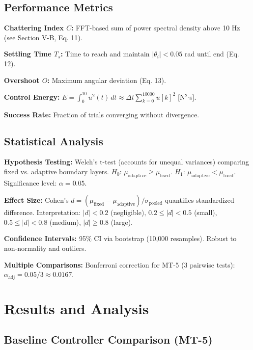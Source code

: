 \documentclass[conference]{IEEEtran}
\begin{document}
\subsection{Performance Metrics}

\textbf{Chattering Index $C$:} FFT-based sum of power spectral density above 10 Hz (see Section V-B, Eq. 11).

\textbf{Settling Time $T_s$:} Time to reach and maintain $|\theta_i| < 0.05$ rad until end (Eq. 12).

\textbf{Overshoot $O$:} Maximum angular deviation (Eq. 13).

\textbf{Control Energy:} $E = \int_0^{10} u^2(t) \, dt \approx \Delta t \sum_{k=0}^{10000} u[k]^2$ [N$^2$$\cdot$s].

\textbf{Success Rate:} Fraction of trials converging without divergence.

\subsection{Statistical Analysis}

\textbf{Hypothesis Testing:} Welch's t-test (accounts for unequal variances) comparing fixed vs. adaptive boundary layers. $H_0$: $\mu_{\text{adaptive}} \geq \mu_{\text{fixed}}$. $H_1$: $\mu_{\text{adaptive}} < \mu_{\text{fixed}}$. Significance level: $\alpha = 0.05$.

\textbf{Effect Size:} Cohen's $d = (\mu_{\text{fixed}} - \mu_{\text{adaptive}}) / \sigma_{\text{pooled}}$ quantifies standardized difference. Interpretation: $|d| < 0.2$ (negligible), $0.2 \leq |d| < 0.5$ (small), $0.5 \leq |d| < 0.8$ (medium), $|d| \geq 0.8$ (large).

\textbf{Confidence Intervals:} 95\% CI via bootstrap (10,000 resamples). Robust to non-normality and outliers.

\textbf{Multiple Comparisons:} Bonferroni correction for MT-5 (3 pairwise tests): $\alpha_{\text{adj}} = 0.05/3 \approx 0.0167$.

\section{Results and Analysis}

\subsection{Baseline Controller Comparison (MT-5)}
\end{document}
